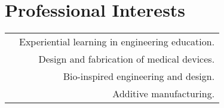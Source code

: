 \section*{Professional Interests}
\begin{tabular}{L!{\VRule}R}
&Experiential learning in engineering education.\\
&Design and fabrication of medical devices.\\
&Bio-inspired engineering and design.\\
&Additive manufacturing.\\
\end{tabular}